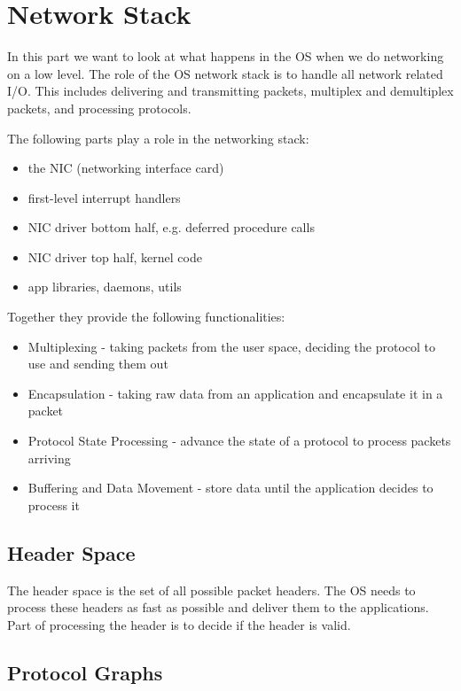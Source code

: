 \section{Network Stack}

In this part we want to look at what happens in the OS when we do networking on a low level. The role of the OS network stack is to handle all network related I/O. This includes delivering and transmitting packets, multiplex and demultiplex packets, and processing protocols. \medskip

The following parts play a role in the networking stack: 
\begin{itemize}
	\item the NIC (networking interface card) 
	\item first-level interrupt handlers
	\item NIC driver bottom half, e.g. deferred procedure calls
	\item NIC driver top half, kernel code
	\item app libraries, daemons, utils
\end{itemize}

Together they provide the following functionalities:
\begin{itemize}
	\item Multiplexing - taking packets from the user space, deciding the protocol to use and sending them out
	\item Encapsulation - taking raw data from an application and encapsulate it in a packet
	\item Protocol State Processing - advance the state of a protocol to process packets arriving
	\item Buffering and Data Movement - store data until the application decides to process it
\end{itemize}


\subsection{Header Space}

The header space is the set of all possible packet headers. The OS needs to process these headers as fast as possible and deliver them to the applications. Part of processing the header is to decide if the header is valid.


\subsection{Protocol Graphs}


